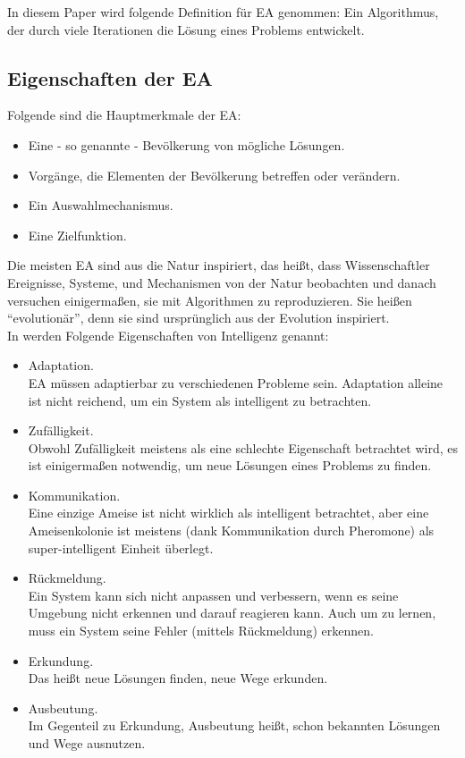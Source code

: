 \documentclass[twoside,twocolumn]{article}
\begin{document}
In diesem Paper wird folgende Definition für EA genommen: Ein Algorithmus, der durch viele Iterationen die Lösung eines Problems entwickelt.

\subsection{Eigenschaften der EA}
Folgende sind die Hauptmerkmale der EA:

\begin{itemize}
\item{Eine - so genannte - Bevölkerung von mögliche Lösungen.}
\item{Vorgänge, die Elementen der Bevölkerung betreffen oder verändern.}
\item{Ein Auswahlmechanismus.}
\item{Eine Zielfunktion.}
\end{itemize}

Die meisten EA sind aus die Natur inspiriert, das heißt, dass Wissenschaftler Ereignisse, Systeme, und Mechanismen von der Natur beobachten und danach versuchen einigermaßen, sie mit Algorithmen zu reproduzieren. Sie heißen ``evolutionär'', denn sie sind ursprünglich aus der Evolution inspiriert. \cite{holland_ga}\\

In \cite{wiley_evolutionary} werden Folgende Eigenschaften von Intelligenz genannt:

\begin{itemize}
\item{Adaptation.}\\
EA müssen adaptierbar zu verschiedenen Probleme sein. Adaptation alleine ist nicht reichend, um ein System als intelligent zu betrachten.\\
\item{Zufälligkeit.}\\
Obwohl Zufälligkeit meistens als eine schlechte Eigenschaft betrachtet wird, es ist einigermaßen notwendig, um neue Lösungen eines Problems zu finden.\\
\item{Kommunikation.}\\
Eine einzige Ameise ist nicht wirklich als intelligent betrachtet, aber eine Ameisenkolonie ist meistens (dank Kommunikation durch Pheromone) als super-intelligent Einheit überlegt.\\
\item{Rückmeldung.}\\
Ein System kann sich nicht anpassen und verbessern, wenn es seine Umgebung nicht erkennen und darauf reagieren kann. Auch um zu lernen, muss ein System seine Fehler (mittels Rückmeldung) erkennen.\\
\item{Erkundung.}\\
Das heißt neue Lösungen finden, neue Wege erkunden.\\
\item{Ausbeutung.}\\
Im Gegenteil zu Erkundung, Ausbeutung heißt, schon bekannten Lösungen und Wege ausnutzen.
\end{itemize}
\end{document}
